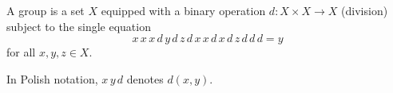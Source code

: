 A group is a set $X$ equipped with a binary operation $d: X \times X \longrightarrow X$ (division) subject to the single equation
$$
x\,x\,x\,d\,y\,d\,z\,d\,x\,x\,d\,x\,d\,z\,d\,d\,d = y
$$
for all $x, y, z \in X$.

In Polish notation, $x\,y\,d$ denotes $d(x, y)$.

